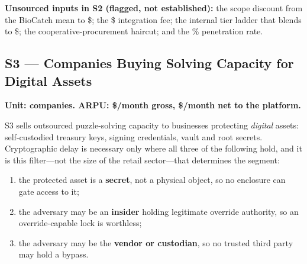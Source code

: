 \noindent\textbf{Unsourced inputs in S2 (flagged, not established):} the scope
discount from the BioCatch mean to \$\numint{\arpuSegTwoAnnualLicence}; the
\$\numint{\arpuSegTwoIntegrationFee} integration fee; the internal tier ladder that
blends to \$\numint{\arpuSegTwoBlendCheck}; the cooperative-procurement haircut; and
the \numint{\targetShareSegTwo}\% penetration rate.

\subsection{S3 --- Companies Buying Solving Capacity for Digital Assets}

\textbf{Unit: companies. ARPU: \$\numint{\arpuSegThreeGrossMonthly}/month gross,
\$\numint{\arpuSegThreeMonthly}/month net to the platform.}

S3 sells outsourced puzzle-solving capacity to businesses protecting \emph{digital}
assets: self-custodied treasury keys, signing credentials, vault and root secrets.
Cryptographic delay is necessary only where all three of the following hold, and it is
this filter---not the size of the retail sector---that determines the segment:

\begin{enumerate}[nosep]
  \item the protected asset is a \textbf{secret}, not a physical object, so no
    enclosure can gate access to it;
  \item the adversary may be an \textbf{insider} holding legitimate override
    authority, so an override-capable lock is worthless;
  \item the adversary may be the \textbf{vendor or custodian}, so no trusted third
    party may hold a bypass.
\end{enumerate}

